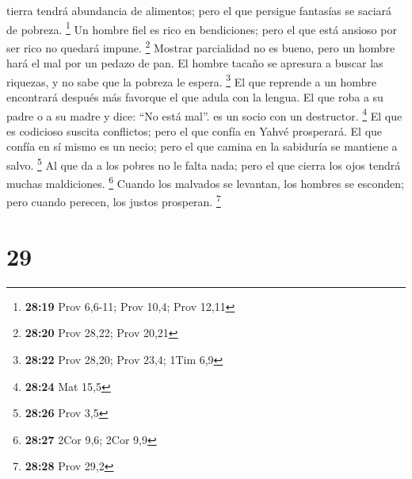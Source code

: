 tierra tendrá abundancia de alimentos; pero el que persigue fantasías se
saciará de pobreza. \footnote{\textbf{28:19} Prov 6,6-11; Prov 10,4;
  Prov 12,11}  Un hombre fiel es rico en bendiciones;
pero el que está ansioso por ser rico no quedará impune. \footnote{\textbf{28:20}
  Prov 28,22; Prov 20,21}  Mostrar parcialidad no es
bueno, pero un hombre hará el mal por un pedazo de pan. 
El hombre tacaño se apresura a buscar las riquezas, y no sabe que la
pobreza le espera. \footnote{\textbf{28:22} Prov 28,20; Prov 23,4; 1Tim
  6,9}  El que reprende a un hombre encontrará después
más favorque el que adula con la lengua.  El que roba a
su padre o a su madre y dice: ``No está mal''. es un socio con un
destructor. \footnote{\textbf{28:24} Mat 15,5}  El que es
codicioso suscita conflictos; pero el que confía en Yahvé prosperará.
 El que confía en sí mismo es un necio; pero el que
camina en la sabiduría se mantiene a salvo. \footnote{\textbf{28:26}
  Prov 3,5}  Al que da a los pobres no le falta nada;
pero el que cierra los ojos tendrá muchas maldiciones. \footnote{\textbf{28:27}
  2Cor 9,6; 2Cor 9,9}  Cuando los malvados se levantan,
los hombres se esconden; pero cuando perecen, los justos prosperan.
\footnote{\textbf{28:28} Prov 29,2}

\hypertarget{section-28}{%
\section{29}\label{section-28}}

